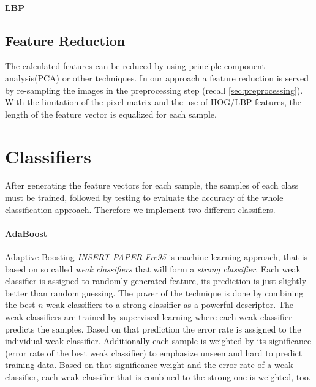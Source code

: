 \documentclass[a4paper,10pt]{article}
\begin{document}
\paragraph{LBP}


\subsection{Feature Reduction}

The calculated features can be reduced by using principle component analysis(PCA) or other techniques.
In our approach a feature reduction is served by re-sampling the images in the preprocessing step (recall \autoref{sec:preprocessing}).
With the limitation of the pixel matrix and the use of HOG/LBP features, the length of the feature vector is equalized for each sample.

\section{Classifiers}

After generating the feature vectors for each sample, the samples of each class must be trained, followed by testing to evaluate the accuracy of the whole classification approach. 
Therefore we implement two different classifiers. 

\paragraph{AdaBoost}
Adaptive Boosting \emph{INSERT PAPER Fre95} is machine learning approach, that is based on so called \textit{weak classifiers} that will form a \textit{strong classifier}. Each weak classifier is assigned to randomly generated feature, its prediction is just slightly better than random guessing. The power of the technique is done by combining the best $n$ weak classifiers to a strong classifier as a powerful descriptor. The weak classifiers are trained by supervised learning where each weak classifier predicts the samples. Based on that prediction the error rate is assigned to the individual weak classifier. Additionally each sample is weighted by its significance (error rate of the best weak classifier) to emphasize unseen and hard to predict training data. Based on that significance weight and the error rate of a weak classifier, each weak classifier that is combined to the strong one is weighted, too.
\end{document}
